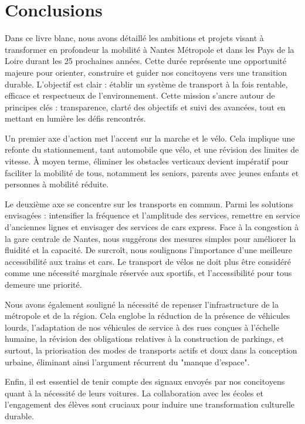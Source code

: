 \chapter{Conclusions}

Dans ce livre blanc, nous avons détaillé les ambitions et projets
visant à transformer en profondeur la mobilité à Nantes Métropole et
dans les Pays de la Loire durant les 25 prochaines années. Cette durée
représente une opportunité majeure pour orienter, construire et guider
nos concitoyens vers une transition durable. L'objectif est clair :
établir un système de transport à la fois rentable, efficace et
respectueux de l'environnement. Cette mission s'ancre autour de
principes clés : transparence, clarté des objectifs et suivi des
avancées, tout en mettant en lumière les défis rencontrés.

Un premier axe d'action met l'accent sur la marche et le vélo. Cela
implique une refonte du stationnement, tant automobile que vélo, et
une révision des limites de vitesse. À moyen terme, éliminer les
obstacles verticaux devient impératif pour faciliter la mobilité de
tous, notamment les seniors, parents avec jeunes enfants et personnes
à mobilité réduite.

Le deuxième axe se concentre sur les transports en commun. Parmi les
solutions envisagées : intensifier la fréquence et l'amplitude des
services, remettre en service d'anciennes lignes et envisager des
services de cars express. Face à la congestion à la gare centrale de
Nantes, nous suggérons des mesures simples pour améliorer la fluidité
et la capacité.  De surcroît, nous soulignons l'importance d'une
meilleure accessibilité aux trains et cars. Le transport de vélos ne
doit plus être considéré comme une nécessité marginale réservée aux
sportifs, et l'accessibilité pour tous demeure une priorité.

Nous avons également souligné la nécessité de repenser
l'infrastructure de la métropole et de la région. Cela englobe la
réduction de la présence de véhicules lourds, l'adaptation de nos
véhicules de service à des rues conçues à l'échelle humaine, la
révision des obligations relatives à la construction de parkings, et
surtout, la priorisation des modes de transports actifs et doux dans
la conception urbaine, éliminant ainsi l'argument récurrent du "manque
d'espace".

Enfin, il est essentiel de tenir compte des signaux envoyés par nos
concitoyens quant à la nécessité de leurs voitures. La collaboration
avec les écoles et l'engagement des élèves sont cruciaux pour induire
une transformation culturelle durable.


